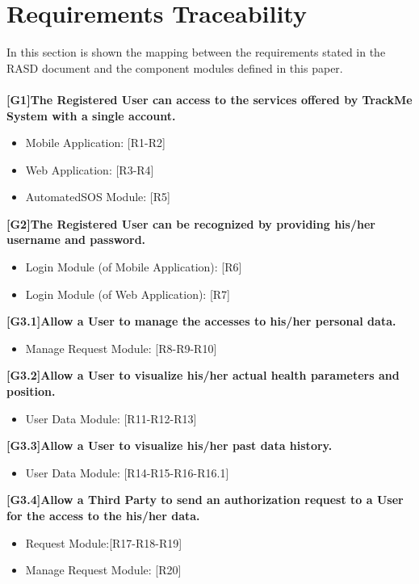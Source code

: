 \chapter{Requirements Traceability}
 In this section is shown the mapping between the requirements stated in the RASD document and the component modules defined in this paper.
\\ \\
\textbf{[G1]The Registered User can access to the services offered by TrackMe System with a single account.}
\begin{itemize}
	\item Mobile Application: [R1-R2]
	\item Web Application: [R3-R4]
	\item AutomatedSOS Module: [R5]
\end{itemize} 

\textbf{[G2]The Registered User can be recognized by providing his/her username and password.}
\begin{itemize}
	\item Login Module (of Mobile Application): [R6] 
	\item Login Module (of Web Application): [R7]
\end{itemize} 

\textbf{[G3.1]Allow a User to manage the accesses to his/her personal data.}
\begin{itemize}
	\item Manage Request Module: [R8-R9-R10]
\end{itemize}

\textbf{[G3.2]Allow a User to visualize his/her actual health parameters and position.}
\begin{itemize}
	\item User Data Module: [R11-R12-R13]
\end{itemize} 

\textbf{[G3.3]Allow a User to visualize his/her past data history.}
\begin{itemize}
	\item User Data Module: [R14-R15-R16-R16.1]
\end{itemize}

\textbf{[G3.4]Allow a Third Party to send an authorization request to a User for
the access to the his/her data.}
\begin{itemize}
	\item Request Module:[R17-R18-R19]
	\item  Manage Request Module: [R20]
\end{itemize}

